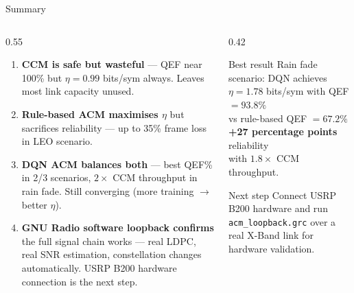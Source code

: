 \documentclass[aspectratio=169,10pt]{beamer}
\begin{document}
\begin{frame}{Summary}
\begin{columns}[T]
  \begin{column}{0.55\textwidth}
    \begin{enumerate}\small
      \item[\textbf{1.}] \textbf{CCM is safe but wasteful} — QEF near 100\% but
        $\eta = 0.99$ bits/sym always. Leaves most link capacity unused.
      \vspace{0.4em}
      \item[\textbf{2.}] \textbf{Rule-based ACM maximises $\eta$} but sacrifices
        reliability — up to 35\% frame loss in LEO scenario.
      \vspace{0.4em}
      \item[\textbf{3.}] \textbf{DQN ACM balances both} — best QEF\% in 2/3
        scenarios, $2\times$ CCM throughput in rain fade. Still converging
        (more training $\to$ better $\eta$).
      \vspace{0.4em}
      \item[\textbf{4.}] \textbf{GNU Radio software loopback confirms} the full signal chain works — real LDPC, real SNR estimation, constellation changes automatically. USRP B200 hardware connection is the next step.
    \end{enumerate}
  \end{column}
  \begin{column}{0.42\textwidth}
    \begin{resultbox}{Best result}
      \small Rain fade scenario: DQN achieves\\
      $\eta = 1.78$ bits/sym with QEF $= 93.8\%$\\
      vs rule-based QEF $= 67.2\%$\\[0.3em]
      \textbf{+27 percentage points} reliability\\with $1.8\times$ CCM throughput.
    \end{resultbox}

    \vspace{0.5em}
    \begin{keybox}{Next step}
      \small Connect USRP B200 hardware and run \texttt{acm\_loopback.grc} over a real X-Band link for hardware validation.
    \end{keybox}
  \end{column}
\end{columns}
\end{frame}
\end{document}
